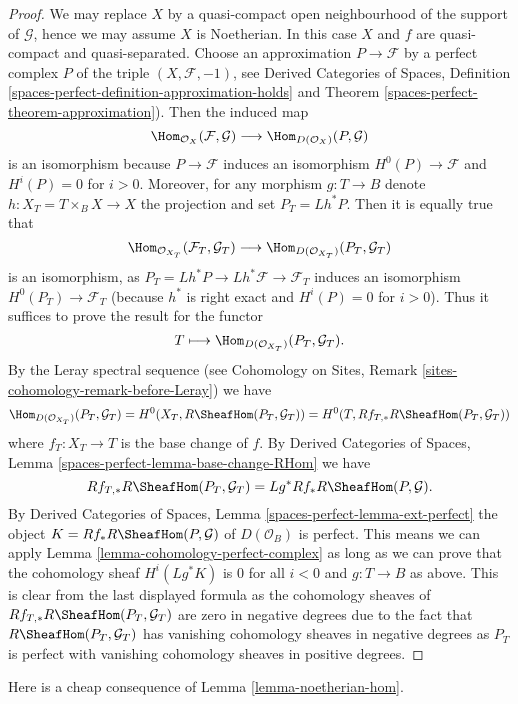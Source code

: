 \begin{proof}
We may replace $X$ by a quasi-compact open neighbourhood of
the support of $\mathcal{G}$, hence we may assume $X$ is Noetherian.
In this case $X$ and $f$ are quasi-compact and quasi-separated.
Choose an approximation $P \to \mathcal{F}$ by a perfect complex $P$ of
the triple $(X, \mathcal{F}, -1)$, see
Derived Categories of Spaces, Definition
\ref{spaces-perfect-definition-approximation-holds} and
Theorem \ref{spaces-perfect-theorem-approximation}).
Then the induced map
$$
\Hom_{\mathcal{O}_X}(\mathcal{F}, \mathcal{G})
\longrightarrow
\Hom_{D(\mathcal{O}_X)}(P, \mathcal{G})
$$
is an isomorphism because $P \to \mathcal{F}$ induces an isomorphism
$H^0(P) \to \mathcal{F}$ and $H^i(P) = 0$ for $i > 0$.
Moreover, for any morphism $g : T \to B$
denote $h : X_T = T \times_B X \to X$ the projection and set
$P_T = Lh^*P$. Then it is equally true that
$$
\Hom_{\mathcal{O}_{X_T}}(\mathcal{F}_T, \mathcal{G}_T)
\longrightarrow
\Hom_{D(\mathcal{O}_{X_T})}(P_T, \mathcal{G}_T)
$$
is an isomorphism, as $P_T = Lh^*P \to Lh^*\mathcal{F} \to \mathcal{F}_T$
induces an isomorphism $H^0(P_T) \to \mathcal{F}_T$ (because $h^*$ is
right exact and $H^i(P) = 0$ for $i > 0$). Thus it suffices to prove the
result for the functor
$$
T \longmapsto \Hom_{D(\mathcal{O}_{X_T})}(P_T, \mathcal{G}_T).
$$
By the Leray spectral sequence (see Cohomology on Sites, Remark
\ref{sites-cohomology-remark-before-Leray}) we have
$$
\Hom_{D(\mathcal{O}_{X_T})}(P_T, \mathcal{G}_T) =
H^0(X_T, R\SheafHom(P_T, \mathcal{G}_T)) =
H^0(T, Rf_{T, *}R\SheafHom(P_T, \mathcal{G}_T))
$$
where $f_T : X_T \to T$ is the base change of $f$. By
Derived Categories of Spaces, Lemma
\ref{spaces-perfect-lemma-base-change-RHom}
we have
$$
Rf_{T, *}R\SheafHom(P_T, \mathcal{G}_T) = Lg^*Rf_*R\SheafHom(P, \mathcal{G}).
$$
By
Derived Categories of Spaces, Lemma
\ref{spaces-perfect-lemma-ext-perfect}
the object $K = Rf_*R\SheafHom(P, \mathcal{G})$ of $D(\mathcal{O}_B)$
is perfect. This means we can apply
Lemma \ref{lemma-cohomology-perfect-complex}
as long as we can prove that the cohomology sheaf
$H^i(Lg^*K)$ is $0$ for all $i < 0$ and $g : T \to B$ as above.
This is clear from the last displayed formula as
the cohomology sheaves of
$Rf_{T, *}R\SheafHom(P_T, \mathcal{G}_T)$
are zero in negative degrees
due to the fact that $R\SheafHom(P_T, \mathcal{G}_T)$ has vanishing
cohomology sheaves in negative degrees as $P_T$ is perfect with
vanishing cohomology sheaves in positive degrees.
\end{proof}

\noindent
Here is a cheap consequence of Lemma \ref{lemma-noetherian-hom}.

